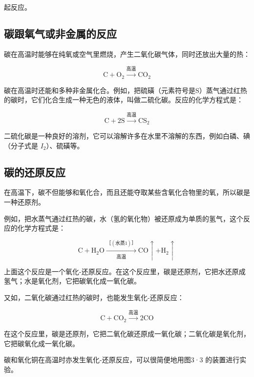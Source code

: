起反应。

\subsection{碳跟氧气或非金属的反应}

碳在高温时能够在纯氧或空气里燃烧，产生二氧化碳气体，同时还放出大量的热：

\[
\mathrm{C} + \mathrm{O}_{2} \xrightarrow {\text{高温}} \mathrm{CO}_{2}
\]

碳在高温时还能和多种非金属化合。例如，把硫磺（元素符号是S）蒸气通过红热的碳时，它们化合生成一种无色的液体，叫做二硫化碳。反应的化学方程式是：

\[
\mathrm{C} + 2 \mathrm{S} \xrightarrow {\text{高温}} \mathrm{CS}_{2}
\]

二硫化碳是一种良好的溶剂，它可以溶解许多在水里不溶解的东西，例如白磷、碘（分子式是
\(I_{2}\)）、硫磺等。

\subsection{碳的还原反应}

在高温下，碳不但能够和氧化合，而且还能夺取某些含氧化合物里的氧，所以碳是一种还原剂。

例如，把水蒸气通过红热的碳，水（氢的氧化物）被还原成为单质的氢气，这个反应的化学方程式是：

\[
\mathrm{C} + \mathrm{H}_{2}\mathrm{O} \xrightarrow[\text{高温}]{\text{［}(\text{水蒸}1)\text{］}} \mathrm{CO}\uparrow + \mathrm{H}_{2}\uparrow
\]

上面这个反应是一个氧化-还原反应。在这个反应里，碳是还原剂，它把水还原成氢气；水是氧化剂，它把碳氧化成一氧化碳。

又如，二氧化碳通过红热的碳时，也能发生氧化-还原反应：

\[
\mathrm{C} + \mathrm{CO}_{2} \xrightarrow {\text{高温}} 2 \mathrm{CO}
\]

在这个反应里，碳是还原剂，它把二氧化碳还原成一氧化碳；二氧化碳是氧化剂，它把碳氧化成一氧化碳。

碳和氧化铜在高温时亦发生氧化-还原反应，可以很简便地用图3·3
的装置进行实验。


